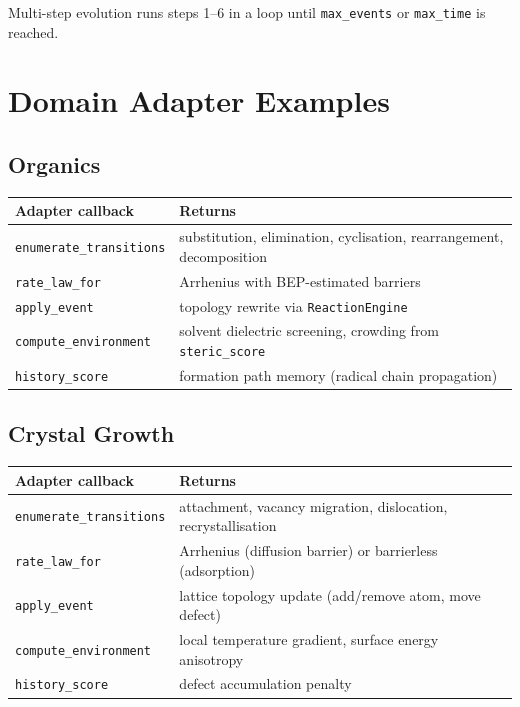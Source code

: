 \documentclass[11pt]{article}
\begin{document}
Multi-step evolution runs steps 1--6 in a loop until
\texttt{max\_events} or \texttt{max\_time} is reached.

\section{Domain Adapter Examples}
\label{sec:adapters}

\subsection{Organics}

\begin{center}
\begin{tabular}{ll}
\toprule
Adapter callback & Returns \\
\midrule
\texttt{enumerate\_transitions} &
  substitution, elimination, cyclisation, rearrangement, decomposition \\
\texttt{rate\_law\_for} &
  Arrhenius with BEP-estimated barriers \\
\texttt{apply\_event} &
  topology rewrite via \texttt{ReactionEngine} \\
\texttt{compute\_environment} &
  solvent dielectric screening, crowding from \texttt{steric\_score} \\
\texttt{history\_score} &
  formation path memory (radical chain propagation) \\
\bottomrule
\end{tabular}
\end{center}

\subsection{Crystal Growth}

\begin{center}
\begin{tabular}{ll}
\toprule
Adapter callback & Returns \\
\midrule
\texttt{enumerate\_transitions} &
  attachment, vacancy migration, dislocation, recrystallisation \\
\texttt{rate\_law\_for} &
  Arrhenius (diffusion barrier) or barrierless (adsorption) \\
\texttt{apply\_event} &
  lattice topology update (add/remove atom, move defect) \\
\texttt{compute\_environment} &
  local temperature gradient, surface energy anisotropy \\
\texttt{history\_score} &
  defect accumulation penalty \\
\bottomrule
\end{tabular}
\end{center}
\end{document}

